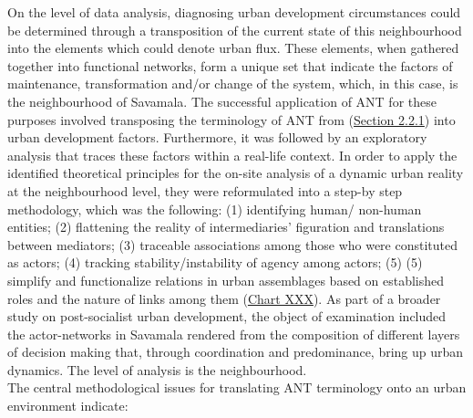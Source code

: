\documentclass[11pt]{report}
\begin{document}
On the level of data analysis, diagnosing urban development circumstances could be determined through a transposition of the current state of this neighbourhood into the elements which could denote urban flux. These elements, when gathered together into functional networks, form a unique set that indicate the factors of maintenance, transformation and/or change of the system, which, in this case, is the neighbourhood of Savamala. The successful application of ANT for these purposes involved transposing the terminology of ANT from (\href{Section 2.2.1}{Section 2.2.1}) into urban development factors. Furthermore, it was followed by an exploratory analysis that traces these factors within a real-life context. In order to apply the identified theoretical principles for the on-site analysis of a dynamic urban reality at the neighbourhood level, they were reformulated into a step-by step methodology, which was the following: (1) identifying human/ non-human entities; (2) flattening the reality of
intermediaries’ figuration and translations between mediators; (3) traceable associations among those who were constituted as actors; (4) tracking stability/instability of agency among actors; (5) (5) simplify and functionalize relations in urban assemblages based on established roles and the nature of links among them (\href{Table ANT discource analysos}{Chart XXX}). As part of a broader study on post-socialist urban development, the object of examination included the actor-networks in Savamala rendered from the composition of different layers of decision making that, through coordination and predominance, bring up urban dynamics. The level of analysis is the neighbourhood. 
\\

The central methodological issues for translating ANT terminology onto an urban environment indicate:
 
\end{document}
